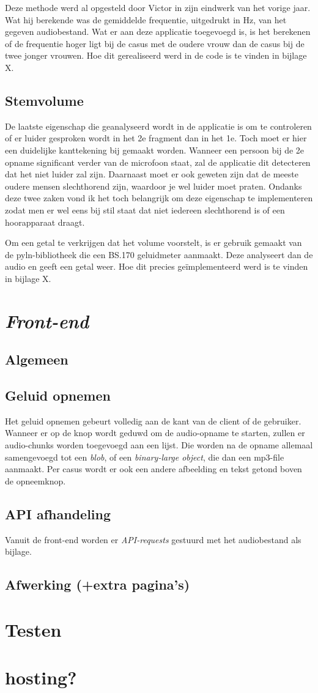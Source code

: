 Deze methode werd al opgesteld door Victor in zijn eindwerk van het vorige jaar. Wat hij berekende was de gemiddelde frequentie, uitgedrukt in Hz, van het gegeven audiobestand. Wat er aan deze applicatie toegevoegd is, is het berekenen of de frequentie hoger ligt bij de casus met de oudere vrouw dan de casus bij de twee jonger vrouwen.
Hoe dit gerealiseerd werd in de code is te vinden in bijlage X.

\subsection{Stemvolume}
De laatste eigenschap die geanalyseerd wordt in de applicatie is om te controleren of er luider gesproken wordt in het 2e fragment dan in het 1e. Toch moet er hier een duidelijke kanttekening bij gemaakt worden. Wanneer een persoon bij de 2e opname significant verder van de microfoon staat, zal de applicatie dit detecteren dat het niet luider zal zijn. Daarnaast moet er ook geweten zijn dat de meeste oudere mensen slechthorend zijn, waardoor je wel luider moet praten. Ondanks deze twee zaken vond ik het toch belangrijk om deze eigenschap te implementeren zodat men er wel eens bij stil staat dat niet iedereen slechthorend is of een hoorapparaat draagt.

Om een getal te verkrijgen dat het volume voorstelt, is er gebruik gemaakt van de pyln-bibliotheek die een BS.170 geluidmeter aanmaakt. Deze analyseert dan de audio en geeft een getal weer. Hoe dit precies geïmplementeerd werd is te vinden in bijlage X.


\section{\textit{Front-end}}
\subsection{Algemeen}
\subsection{Geluid opnemen}
Het geluid opnemen gebeurt volledig aan de kant van de client of de gebruiker. Wanneer er op de knop wordt geduwd om de audio-opname te starten, zullen er audio-chunks worden toegevoegd aan een lijst. Die worden na de opname allemaal samengevoegd tot een \textit{blob}, of een \textit{binary-large object}, die dan een mp3-file aanmaakt.
Per casus wordt er ook een andere afbeelding en tekst getond boven de opneemknop.

\subsection{API afhandeling}
Vanuit de front-end worden er \textit{API-requests} gestuurd met het audiobestand als bijlage.
\subsection{Afwerking (+extra pagina's)}

\section{Testen}

\section{hosting?}
